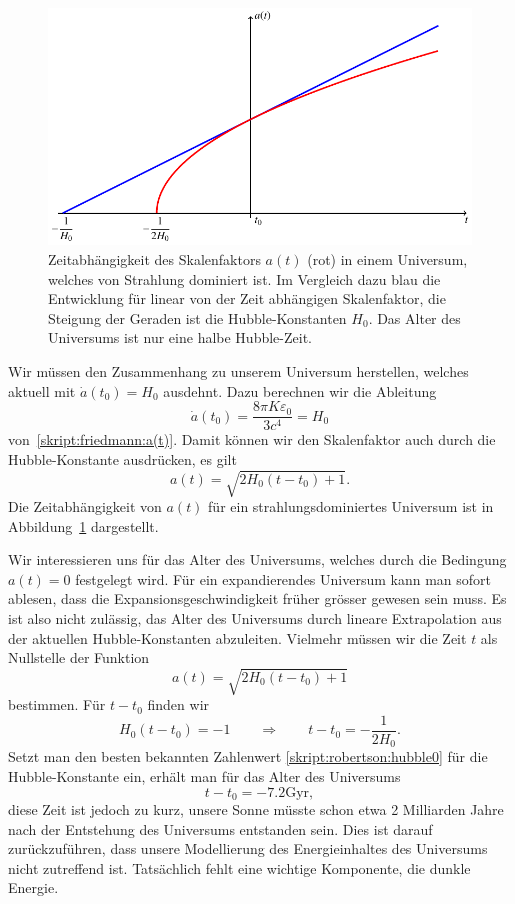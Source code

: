 \begin{figure}
\centering
\includegraphics{chapters/tikz/friedmann-strahlung.pdf}
\caption{Zeitabhängigkeit des Skalenfaktors $a(t)$ ({\color{red}rot})
in einem Universum, welches von Strahlung dominiert ist.
Im Vergleich dazu {\color{blue}blau} die Entwicklung für linear von der
Zeit abhängigen Skalenfaktor, die Steigung der Geraden ist die
Hubble-Konstanten $H_0$.
Das Alter des Universums ist nur eine halbe Hubble-Zeit.
\label{skript:friedmann:graph:strahlung}}
\end{figure}

Wir müssen den Zusammenhang zu unserem Universum herstellen, welches
aktuell mit $\dot a(t_0)= H_0$ ausdehnt.
Dazu berechnen wir die Ableitung
\[
\dot a(t_0)=\frac{8\pi K\varepsilon_0}{3c^4}=H_0
\]
von~\eqref{skript:friedmann:a(t)}.
Damit können wir den Skalenfaktor auch durch die Hubble-Konstante ausdrücken,
es gilt
\begin{equation}
a(t)=\sqrt{2H_0(t-t_0)+1}.
\label{skript:friedmann:a(t):strahlung}
\end{equation}
Die Zeitabhängigkeit von $a(t)$ für ein strahlungsdominiertes Universum
ist in Abbildung~\ref{skript:friedmann:graph:strahlung} dargestellt.

Wir interessieren uns für das Alter des Universums, welches durch
die Bedingung $a(t)=0$ festgelegt wird.
Für ein expandierendes Universum kann man sofort ablesen, dass
die Expansionsgeschwindigkeit früher grösser gewesen sein muss.
Es ist also nicht zulässig, das Alter des Universums durch lineare
Extrapolation aus der aktuellen Hubble-Konstanten abzuleiten.
Vielmehr müssen wir die Zeit $t$ als Nullstelle der Funktion
\[
a(t)=\sqrt{2H_0(t-t_0)+1}
\]
bestimmen.
Für $t-t_0$ finden wir
\[
H_0(t-t_0)
=
-1
\qquad\Rightarrow\qquad
t-t_0 = -\frac1{2H_0}.
\]
Setzt man den besten bekannten Zahlenwert
\eqref{skript:robertson:hubble0}
für die Hubble-Konstante ein,
erhält man für das Alter des Universums
\[
t-t_0=-7.2\text{Gyr},
\]
diese Zeit ist jedoch zu kurz, unsere Sonne müsste schon etwa
2 Milliarden Jahre nach der Entstehung des Universums entstanden
sein.
Dies ist darauf zurückzuführen, dass unsere Modellierung des
Energieinhaltes des Universums nicht zutreffend ist.
Tatsächlich fehlt eine wichtige Komponente, die dunkle Energie.

